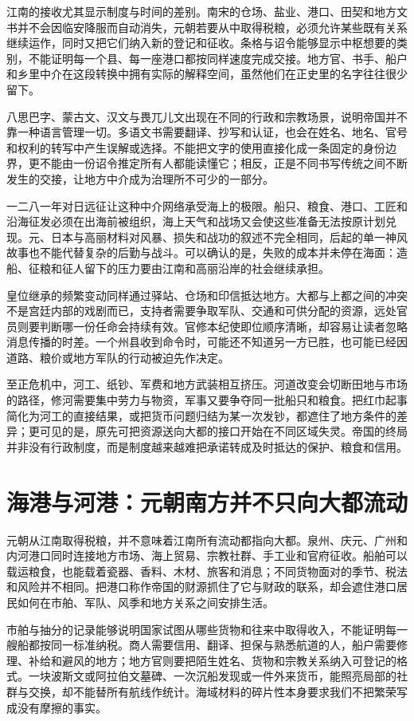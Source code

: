 江南的接收尤其显示制度与时间的差别。南宋的仓场、盐业、港口、田契和地方文书并不会因临安降服而自动消失，元朝若要从中取得税粮，必须允许某些既有关系继续运作，同时又把它们纳入新的登记和征收。条格与诏令能够显示中枢想要的类别，不能证明每一个县、每一座港口都按同样速度完成交接。地方官、书手、船户和乡里中介在这段转换中拥有实际的解释空间，虽然他们在正史里的名字往往很少留下。

八思巴字、蒙古文、汉文与畏兀儿文出现在不同的行政和宗教场景，说明帝国并不靠一种语言管理一切。多语文书需要翻译、抄写和认证，也会在姓名、地名、官号和权利的转写中产生误解或选择。不能把文字的使用直接化成一条固定的身份边界，更不能由一份诏令推定所有人都能读懂它；相反，正是不同书写传统之间不断发生的交接，让地方中介成为治理所不可少的一部分。

一二八一年对日远征让这种中介网络承受海上的极限。船只、粮食、港口、工匠和沿海征发必须在出海前被组织，海上天气和战场又会使这些准备无法按原计划兑现。元、日本与高丽材料对风暴、损失和战功的叙述不完全相同，后起的单一神风故事也不能代替复杂的后勤与战斗。可以确认的是，失败的成本并未停在海面：造船、征粮和征人留下的压力要由江南和高丽沿岸的社会继续承担。

皇位继承的频繁变动同样通过驿站、仓场和印信抵达地方。大都与上都之间的冲突不是宫廷内部的戏剧而已，支持者需要争取军队、交通和可供分配的资源，远处官员则要判断哪一份任命会持续有效。官修本纪使即位顺序清晰，却容易让读者忽略消息传播的时差。一个州县收到命令时，可能还不知道另一方已胜，也可能已经因道路、粮价或地方军队的行动被迫先作决定。

至正危机中，河工、纸钞、军费和地方武装相互挤压。河道改变会切断田地与市场的路径，修河需要集中劳力与物资，军事又要争夺同一批船只和粮食。把红巾起事简化为河工的直接结果，或把货币问题归结为某一次发钞，都遮住了地方条件的差异；更可见的是，原先可把资源送向大都的接口开始在不同区域失灵。帝国的终局并非没有行政制度，而是制度越来越难把承诺转成及时抵达的保护、粮食和信用。

\section{海港与河港：元朝南方并不只向大都流动}

元朝从江南取得税粮，并不意味着江南所有流动都指向大都。泉州、庆元、广州和内河港口同时连接地方市场、海上贸易、宗教社群、手工业和官府征收。船舶可以载运粮食，也能载着瓷器、香料、木材、旅客和消息；不同货物面对的季节、税法和风险并不相同。把港口称作帝国的财源抓住了它与财政的联系，却会遮住港口居民如何在市舶、军队、风季和地方关系之间安排生活。

市舶与抽分的记录能够说明国家试图从哪些货物和往来中取得收入，不能证明每一艘船都按同一标准纳税。商人需要信用、翻译、担保与熟悉航道的人，船户需要修理、补给和避风的地方；地方官则要把陌生姓名、货物和宗教关系纳入可登记的格式。一块波斯文或阿拉伯文墓碑、一次沉船发现或一件外来货币，能照亮局部的社群与交换，却不能替所有航线作统计。海域材料的碎片性本身要求我们不把繁荣写成没有摩擦的事实。

